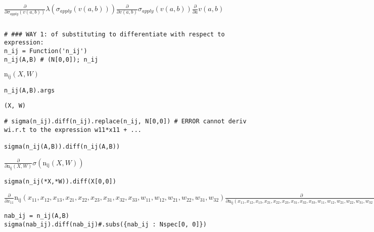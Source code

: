 \documentclass[
]{article}
\begin{document}
\(\displaystyle \frac{\partial}{\partial \sigma_{apply}{\left(v{\left(a,b \right)} \right)}} \lambda{\left(\sigma_{apply}{\left(v{\left(a,b \right)} \right)} \right)} \frac{\partial}{\partial v{\left(a,b \right)}} \sigma_{apply}{\left(v{\left(a,b \right)} \right)} \frac{\partial}{\partial a} v{\left(a,b \right)}\)

\begin{verbatim}

\end{verbatim}

\begin{verbatim}
# ### WAY 1: of substituting to differentiate with respect to expression:
n_ij = Function('n_ij')
n_ij(A,B) # (N[0,0]); n_ij
\end{verbatim}

\(\displaystyle \operatorname{n_{ij}}{\left(X,W \right)}\)

\begin{verbatim}
n_ij(A,B).args
\end{verbatim}

\begin{verbatim}
(X, W)
\end{verbatim}

\begin{verbatim}
# sigma(n_ij).diff(n_ij).replace(n_ij, N[0,0]) # ERROR cannot deriv wi.r.t to the expression w11*x11 + ...

sigma(n_ij(A,B)).diff(n_ij(A,B))
\end{verbatim}

\(\displaystyle \frac{\partial}{\partial \operatorname{n_{ij}}{\left(X,W \right)}} \sigma{\left(\operatorname{n_{ij}}{\left(X,W \right)} \right)}\)

\begin{verbatim}
sigma(n_ij(*X,*W)).diff(X[0,0])
\end{verbatim}

\(\displaystyle \frac{\partial}{\partial x_{11}} \operatorname{n_{ij}}{\left(x_{11},x_{12},x_{13},x_{21},x_{22},x_{23},x_{31},x_{32},x_{33},w_{11},w_{12},w_{21},w_{22},w_{31},w_{32} \right)} \frac{\partial}{\partial \operatorname{n_{ij}}{\left(x_{11},x_{12},x_{13},x_{21},x_{22},x_{23},x_{31},x_{32},x_{33},w_{11},w_{12},w_{21},w_{22},w_{31},w_{32} \right)}} \sigma{\left(\operatorname{n_{ij}}{\left(x_{11},x_{12},x_{13},x_{21},x_{22},x_{23},x_{31},x_{32},x_{33},w_{11},w_{12},w_{21},w_{22},w_{31},w_{32} \right)} \right)}\)

\begin{verbatim}
nab_ij = n_ij(A,B)
sigma(nab_ij).diff(nab_ij)#.subs({nab_ij : Nspec[0, 0]})
\end{verbatim}
\end{document}
